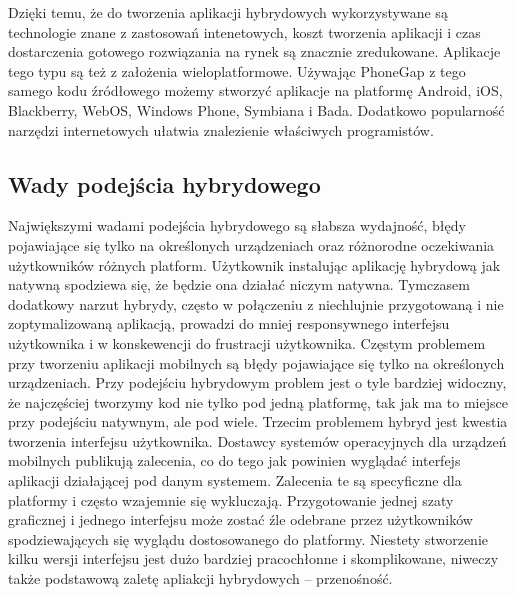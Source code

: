 \documentclass[a4paper]{article}
\begin{document}
Dzięki temu, że do tworzenia aplikacji hybrydowych wykorzystywane są technologie
znane z zastosowań intenetowych, koszt tworzenia aplikacji i czas dostarczenia
gotowego rozwiązania na rynek są znacznie zredukowane. Aplikacje tego typu są też
z założenia wieloplatformowe. Używając PhoneGap z tego samego kodu źródłowego
możemy stworzyć aplikacje na platformę Android, iOS, Blackberry, WebOS,
Windows Phone, Symbiana i Bada. Dodatkowo popularność narzędzi internetowych
ułatwia znalezienie właściwych programistów.

\subsection{Wady podejścia hybrydowego}
Największymi wadami podejścia hybrydowego są słabsza wydajność, błędy
pojawiające się tylko na określonych urządzeniach oraz różnorodne oczekiwania
użytkowników różnych platform. Użytkownik instalując aplikację hybrydową jak
natywną spodziewa się, że będzie ona działać niczym natywna. Tymczasem
dodatkowy narzut hybrydy, często w połączeniu z niechlujnie przygotowaną i nie
zoptymalizowaną aplikacją, prowadzi do mniej responsywnego interfejsu
użytkownika i w konskewencji do frustracji użytkownika. Częstym problemem przy
tworzeniu aplikacji mobilnych są błędy pojawiające się tylko na określonych
urządzeniach. Przy podejściu hybrydowym problem jest o tyle bardziej widoczny, że
najczęściej tworzymy kod nie tylko pod jedną platformę, tak jak ma to miejsce przy
podejściu natywnym, ale pod wiele. Trzecim problemem hybryd jest kwestia
tworzenia interfejsu użytkownika. Dostawcy systemów operacyjnych dla urządzeń
mobilnych publikują zalecenia, co do tego jak powinien wyglądać interfejs aplikacji
działającej pod danym systemem. Zalecenia te są specyficzne dla platformy i często
wzajemnie się wykluczają. Przygotowanie jednej szaty graficznej i jednego interfejsu
może zostać źle odebrane przez użytkowników spodziewających się wyglądu
dostosowanego do platformy. Niestety stworzenie kilku wersji interfejsu jest dużo
bardziej pracochłonne i skomplikowane, niweczy także podstawową zaletę apliakcji
hybrydowych – przenośność.
\end{document}

